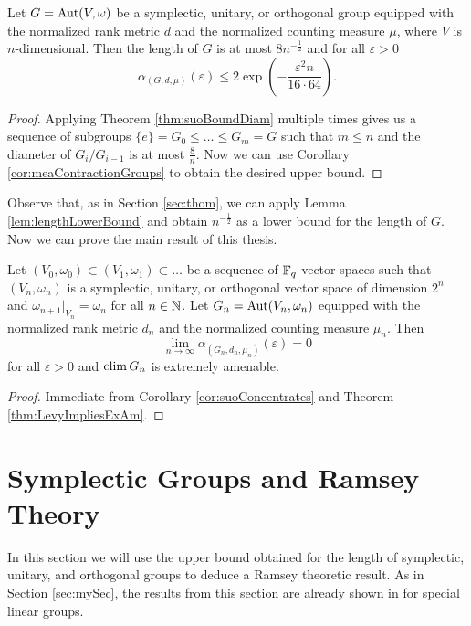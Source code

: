 \begin{corollary}\label{cor:suoConcentrates}
	Let $G=\operatorname{Aut}(V,\omega)$ be a symplectic, unitary, or orthogonal group equipped with the normalized rank metric $d$ and the normalized counting measure $\mu$, where $V$ is $n$-dimensional. Then the length of $G$ is at most $8n^{-\frac{1}{2}}$ and for all $\varepsilon>0$
	\[\alpha_{(G,d,\mu)}(\varepsilon)\leq 2\exp\left(-\frac{\varepsilon^2n}{16\cdot64}\right).\]
\end{corollary}
\begin{proof}
	Applying Theorem \ref{thm:suoBoundDiam} multiple times gives us a sequence of subgroups $\{e\}=G_0\leq \dots\leq G_m=G$ such that $m\leq n$ and the diameter of $G_i/G_{i-1}$ is at most $\frac{8}{n}$. Now we can use Corollary \ref{cor:meaContractionGroups} to obtain the desired upper bound.
\end{proof}
Observe that, as in Section \ref{sec:thom}, we can apply Lemma \ref{lem:lengthLowerBound} and obtain $n^{-\frac{1}{2}}$ as a lower bound for the length of $G$.
Now we can prove the main result of this thesis.
\begin{corollary}
	Let $(V_0,\omega_0)\subset (V_1,\omega_1)\subset \dots$ be a sequence of $\mathbb{F}_q$ vector spaces such that $(V_n,\omega_n)$ is a symplectic, unitary, or orthogonal vector space of dimension $2^n$ and $\omega_{n+1}|_{V_n}=\omega_n$ for all $n\in\mathbb{N}$. Let $G_{n}=\operatorname{Aut}(V_n,\omega_n)$ equipped with the normalized rank metric $d_n$ and the normalized counting measure $\mu_n$. 
	Then \[\lim_{n\to\infty}\alpha_{(G_n,d_n,\mu_n)}(\varepsilon)=0\] for all $\varepsilon>0$ and $\operatorname{clim} G_n$ is extremely amenable.
\end{corollary}
\begin{proof}
	Immediate from Corollary \ref{cor:suoConcentrates} and Theorem \ref{thm:LevyImpliesExAm}.
\end{proof}
		
\section{Symplectic Groups and Ramsey Theory}\label{sec:ramsey}
In this section we will use the upper bound obtained for the length of symplectic, unitary, and orthogonal groups to deduce a Ramsey theoretic result. %
As in Section \ref{sec:mySec}, the results from this section are already shown in \cite{thom} for special linear groups. 
		

